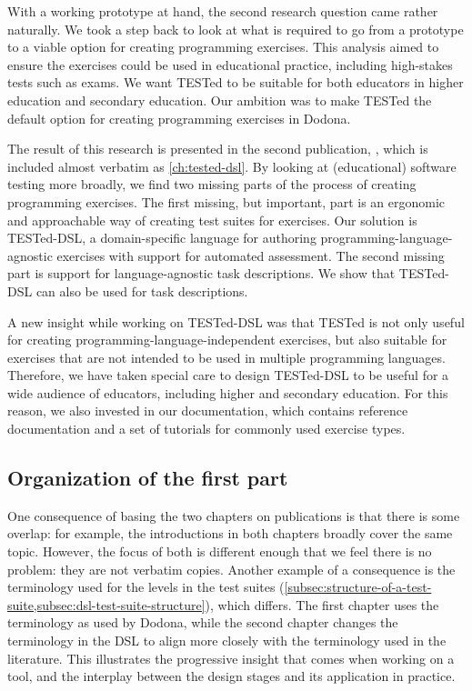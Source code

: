 \documentclass[../main]{subfiles}
\begin{document}
With a working prototype at hand, the second research question came rather naturally.
We took a step back to look at what is required to go from a prototype to a viable option for creating programming exercises.
This analysis aimed to ensure the exercises could be used in educational practice, including high-stakes tests such as exams.
We want TESTed to be suitable for both educators in higher education and secondary education.
Our ambition was to make TESTed the default option for creating programming exercises in Dodona.

The result of this research is presented in the second publication, \textcite{strijbolTESTedDSLDomainspecificLanguage2024}, which is included almost verbatim as \cref{ch:tested-dsl}.
By looking at (educational) software testing more broadly, we find two missing parts of the process of creating programming exercises.
The first missing, but important, part is an ergonomic and approachable way of creating test suites for exercises.
Our solution is TESTed-DSL, a domain-specific language for authoring programming-language-agnostic exercises with support for automated assessment.
The second missing part is support for language-agnostic task descriptions.
We show that TESTed-DSL can also be used for task descriptions.

A new insight while working on TESTed-DSL was that TESTed is not only useful for creating programming-language-independent exercises, but also suitable for exercises that are not intended to be used in multiple programming languages.
Therefore, we have taken special care to design TESTed-DSL to be useful for a wide audience of educators, including higher and secondary education.
For this reason, we also invested in our documentation, which contains reference documentation and a set of tutorials for commonly used exercise types.

\subsection{Organization of the first part}\label{subsec:organization-of-the-first-part}

One consequence of basing the two chapters on publications is that there is some overlap: for example, the introductions in both chapters broadly cover the same topic.
However, the focus of both is different enough that we feel there is no problem: they are not verbatim copies.
Another example of a consequence is the terminology used for the levels in the test suites (\cref{subsec:structure-of-a-test-suite,subsec:dsl-test-suite-structure}), which differs.
The first chapter uses the terminology as used by Dodona, while the second chapter changes the terminology in the DSL to align more closely with the terminology used in the literature.
This illustrates the progressive insight that comes when working on a tool, and the interplay between the design stages and its application in practice.
\end{document}

